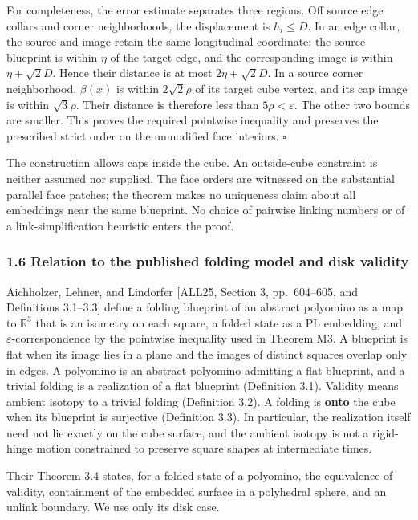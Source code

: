 \documentclass[
  11pt,
]{article}
\begin{document}
For completeness, the error estimate separates three regions. Off source
edge collars and corner neighborhoods, the displacement is
\(h_i\leq D\). In an edge collar, the source and image retain the same
longitudinal coordinate; the source blueprint is within \(\eta\) of the
target edge, and the corresponding image is within \(\eta+\sqrt2D\).
Hence their distance is at most \(2\eta+\sqrt2D\). In a source corner
neighborhood, \(\beta(x)\) is within \(2\sqrt2\rho\) of its target cube
vertex, and its cap image is within \(\sqrt3\rho\). Their distance is
therefore less than \(5\rho<\varepsilon\). The other two bounds are
smaller. This proves the required pointwise inequality and preserves the
prescribed strict order on the unmodified face interiors. \(\square\)

The construction allows caps inside the cube. An outside-cube constraint
is neither assumed nor supplied. The face orders are witnessed on the
substantial parallel face patches; the theorem makes no uniqueness claim
about all embeddings near the same blueprint. No choice of pairwise
linking numbers or of a link-simplification heuristic enters the proof.

\subsubsection{1.6 Relation to the published folding model and disk
validity}\label{relation-to-the-published-folding-model-and-disk-validity}

Aichholzer, Lehner, and Lindorfer {[}ALL25, Section 3, pp.~604--605, and
Definitions 3.1--3.3{]} define a folding blueprint of an abstract
polyomino as a map to \(\mathbb R^3\) that is an isometry on each
square, a folded state as a PL embedding, and
\(\varepsilon\)-correspondence by the pointwise inequality used in
Theorem M3. A blueprint is flat when its image lies in a plane and the
images of distinct squares overlap only in edges. A polyomino is an
abstract polyomino admitting a flat blueprint, and a trivial folding is
a realization of a flat blueprint (Definition 3.1). Validity means
ambient isotopy to a trivial folding (Definition 3.2). A folding is
\textbf{onto} the cube when its blueprint is surjective (Definition
3.3). In particular, the realization itself need not lie exactly on the
cube surface, and the ambient isotopy is not a rigid-hinge motion
constrained to preserve square shapes at intermediate times.

Their Theorem 3.4 states, for a folded state of a polyomino, the
equivalence of validity, containment of the embedded surface in a
polyhedral sphere, and an unlink boundary. We use only its disk case.
\end{document}
